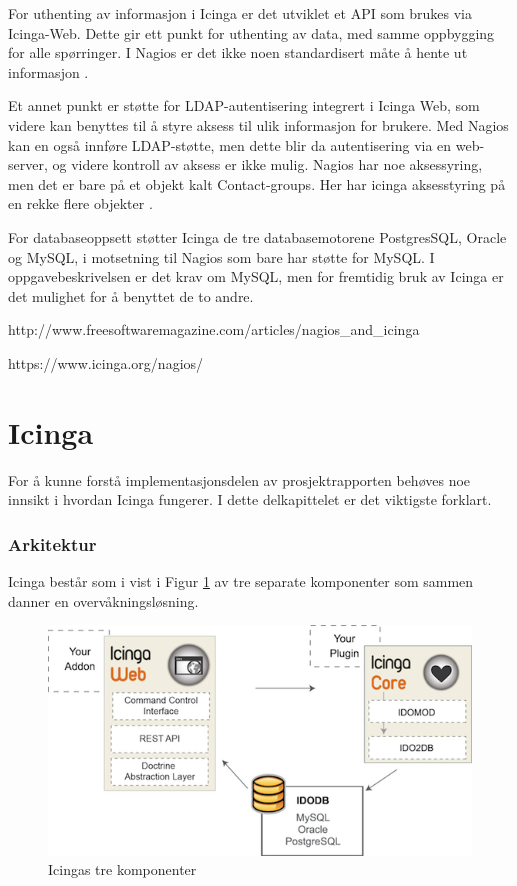 For uthenting av informasjon i Icinga er det utviklet et API som brukes via Icinga-Web. Dette gir ett punkt for uthenting av data, med samme oppbygging for alle spørringer. I Nagios er det ikke noen standardisert måte å hente ut informasjon \cite{icingaapi}. 

Et annet punkt er støtte for LDAP-autentisering integrert i Icinga Web, som videre kan benyttes til å styre aksess til ulik informasjon for brukere. Med Nagios kan en også innføre LDAP-støtte, men dette blir da autentisering via en web-server, og videre kontroll av aksess er ikke mulig. Nagios har noe aksessyring, men det er bare på et objekt kalt Contact-groups. Her har icinga aksesstyring på en rekke flere objekter \cite{icingaweb}.

For databaseoppsett støtter Icinga de tre databasemotorene PostgresSQL, Oracle og MySQL, i motsetning til Nagios som bare har støtte for MySQL. I oppgavebeskrivelsen er det krav om MySQL, men for fremtidig bruk av Icinga er det mulighet for å benyttet de to andre.

http://www.freesoftwaremagazine.com/articles/nagios\_and\_icinga \cite{nagiosvsicinga}

https://www.icinga.org/nagios/ \cite{icinganagios}

\section{Icinga}

For å kunne forstå implementasjonsdelen av prosjektrapporten behøves noe innsikt i hvordan Icinga fungerer. I dette delkapittelet er det viktigste forklart.

\subsubsection{Arkitektur}

Icinga består som i vist i Figur \ref{icingacomponents} av tre separate komponenter som sammen danner en overvåkningsløsning.

\begin{center}
\begin{figure}
    \includegraphics[scale=1.2]{img/icinga_architecture}
    \caption{Icingas tre komponenter}
    \label{icingacomponents}
\end{figure}
\end{center}

